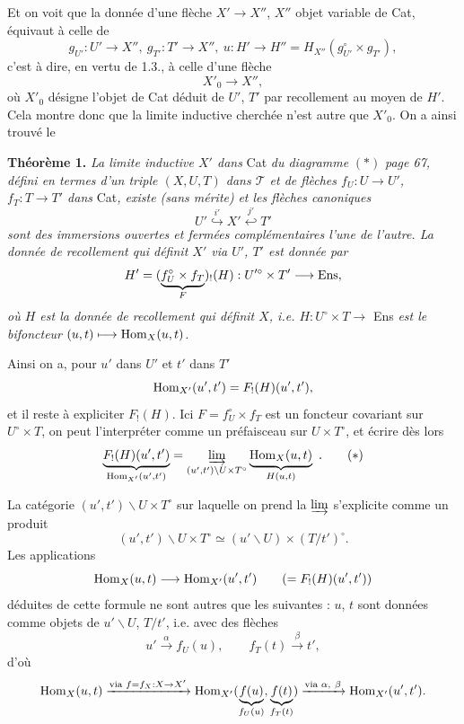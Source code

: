 Et on voit que la donnée d'une flèche $X'\longrightarrow X''$, $X''$ objet variable de Cat, équivaut à celle de
\[
g_{U'} : U'\longrightarrow X'',\ g_{T'} : T'\longrightarrow X'',\ u : H'\longrightarrow H'' = H_{X''}(g_{U'}^{\circ}\times g_{T'}),
\]
c'est à dire, en vertu de 1.3., à celle d'une flèche
\[
X'_0 \longrightarrow X'',
\]
où $X'_0$ désigne l'objet de Cat déduit de $U'$, $T'$ par recollement au moyen de $H'$. Cela montre donc que la limite inductive cherchée n'est autre que $X'_0$. On a ainsi trouvé le

\textbf{Théorème 1.} \textit{La limite inductive $X'$ dans} Cat \textit{du diagramme} $(*)$ \textit{page 67, défini en termes d'un triple $(X,U,T)$ dans $\mathcal{T}$ et de flèches $f_U : U\longrightarrow U'$, $f_T : T\longrightarrow T'$ dans} Cat\textit{, existe (sans mérite)}  \textit{et les flèches canoniques}
\[
U' \overset{i'}{\hookrightarrow} X' \overset{j'}{\hookleftarrow} T'
\]
\textit{sont des immersions ouvertes et fermées complémentaires l'une de l'autre. La donnée de recollement qui définit $X'$ via $U'$, $T'$ est donnée par}
\[
H' = (\underbrace{f_U^{\circ}\times f_T}_{F})_{!}(H) : U'^{\circ}\times T' \longrightarrow \mathrm{Ens},
\]
\textit{où $H$ est la donnée de recollement qui définit $X$, i.e. $H : U^{\circ}\times T\longrightarrow$} Ens \textit{est le bifoncteur $(u,t)\longmapsto \mathrm{Hom}_X(u,t)$.}

Ainsi on a, pour $u'$ dans $U'$ et $t'$ dans $T'$
\[
\mathrm{Hom}_{X'}(u',t') = F_{!}(H)(u',t'),
\]
et il reste à expliciter $F_{!}(H)$. Ici $F=f_U^{\circ}\times f_T$ est un foncteur covariant sur $U^{\circ}\times T$, on peut l'interpréter comme un préfaisceau sur $U\times T^{\circ}$, et écrire dès lors
\[
\underbrace{F_{!}(H)(u',t')}_{\mathrm{Hom}_{X'}(u',t')} = \varinjlim_{(u',t')\backslash U\times T^{\circ}} \underbrace{\mathrm{Hom}_X(u,t)}_{H(u,t)} \ .
\tag*{$(*)$}
\]

La catégorie $(u',t')\backslash U\times T^{\circ}$ sur laquelle on prend la $\varinjlim$ s'explicite comme un produit
\[
(u',t')\backslash U\times T^{\circ} \simeq (u'\backslash U)\times(T/t')^{\circ}.
\]
Les applications
\[
\mathrm{Hom}_X(u,t)\longrightarrow \mathrm{Hom}_{X'}(u',t') \qquad (=F_{!}(H)(u',t'))
\]
 déduites de cette formule ne sont autres que les suivantes : $u$, $t$ sont données comme objets de $u'\backslash U$, $T/t'$, i.e. avec des flèches
\[
u'\xrightarrow{\alpha} f_U(u), \qquad f_T(t)\xrightarrow{\beta} t',
\]
d'où
\[
\mathrm{Hom}_X(u,t) \xrightarrow{\text{via } f=f_X:X\to X'} \mathrm{Hom}_{X'}(\underbrace{f(u)}_{f_U(u)},\underbrace{f(t)}_{f_T(t)}) \xrightarrow{\text{via } \alpha,\ \beta} \mathrm{Hom}_{X'}(u',t').
\]

